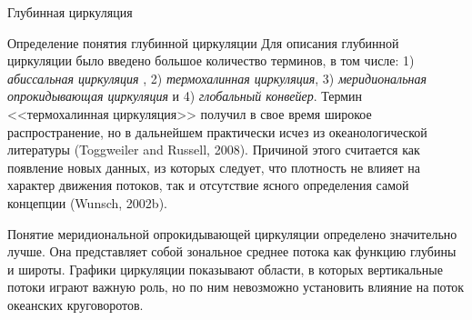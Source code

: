 \begin{chapter}{Глубинная циркуляция}
\begin{section}{Определение понятия глубинной циркуляции}
Для описания глубинной циркуляции было введено большое количество терминов, 
в том числе:
1) \emph{абиссальная циркуляция}%
, 
2) \emph{термохалинная циркуляция}, 
3) \emph{меридиональная опрокидывающая циркуляция}%
%
%
и 4) \emph{глобальный конвейер}. 
Термин <<термохалинная циркуляция>> получил в свое время широкое 
распространение, но в дальнейшем практически исчез из океанологической
литературы (Toggweiler and Russell, 2008). Причиной этого считается как
появление новых данных, из которых следует, что плотность не влияет
на характер движения потоков, так и отсутствие ясного определения самой
концепции (Wunsch, 2002b).
%

Понятие меридиональной опрокидывающей циркуляции определено значительно лучше. 
Она представляет собой зональное среднее потока как функцию глубины и широты.
Графики циркуляции показывают области, в которых вертикальные потоки играют
важную роль, но по ним невозможно установить влияние на поток океанских
круговоротов.
%


\end{section}
\end{chapter}
